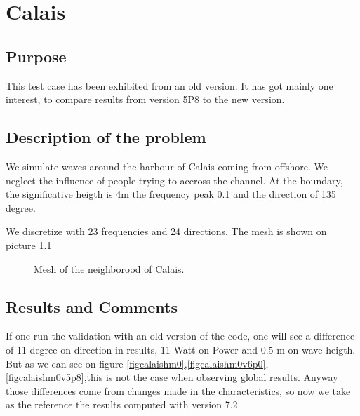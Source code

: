 \chapter{Calais}
%
%
\section{Purpose}
%
This test case has been exhibited from an old version. It has got mainly one interest, to compare results from version 5P8 to the new version.  

%
\section{Description of the problem}
We simulate waves around the harbour of Calais coming from offshore. We neglect the influence of people trying to accross the channel.
At the boundary, the significative heigth is 4m the frequency peak 0.1 and the direction of 135 degree.

We discretize with 23 frequencies and 24 directions. The mesh is shown on picture \ref{figcalaismesh}

\begin{figure} [!h]
\centering
{}
 \caption{Mesh of the neighborood of Calais. }
\label{figcalaismesh}
\end{figure}

\section{Results and Comments}

If one run the validation with an old version of the code, one will see a difference of 11 degree on direction in results, 11 Watt on Power and 0.5 m on wave heigth. But as we can see on figure  \ref{figcalaishm0},\ref{figcalaishm0v6p0}, \ref{figcalaishm0v5p8},this is not the case when observing global results. Anyway those differences come from changes made in the characteristics, so now we take as the reference the results computed with version 7.2. 

